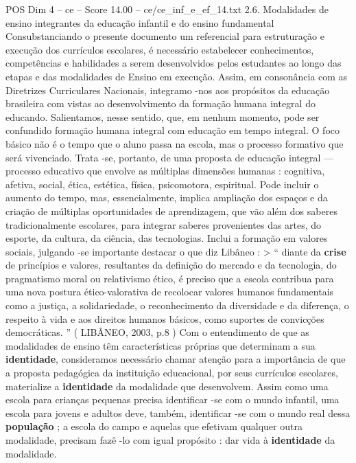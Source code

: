 \begin{textsample}{POS Dim 4 – ce – Score 14.00 – ce/ce\_inf\_e\_ef\_14.txt}  \label{ex:f4_pos_133}
2.6.
Modalidades de ensino integrantes da educação infantil e do ensino fundamental Consubstanciando o presente documento um referencial para estruturação e execução dos currículos escolares, é necessário estabelecer conhecimentos, competências e habilidades a serem desenvolvidos pelos estudantes ao longo das etapas e das modalidades de Ensino em execução.
Assim, em consonância com as Diretrizes Curriculares Nacionais, integramo -nos aos propósitos da educação brasileira com vistas ao desenvolvimento da formação humana integral do educando.
Salientamos, nesse sentido, que, em nenhum momento, pode ser confundido formação humana integral com educação em tempo integral.
O foco básico não é o tempo que o aluno passa na escola, mas o processo formativo que será vivenciado.
Trata -se, portanto, de uma proposta de educação integral — processo educativo que envolve as múltiplas dimensões humanas : cognitiva, afetiva, social, ética, estética, física, psicomotora, espiritual.
Pode incluir o aumento do tempo, mas, essencialmente, implica ampliação dos espaços e da criação de múltiplas oportunidades de aprendizagem, que vão além dos saberes tradicionalmente escolares, para integrar saberes provenientes das artes, do esporte, da cultura, da ciência, das tecnologias.
Inclui a formação em valores sociais, julgando -se importante destacar o que diz Libâneo : > “ diante da \textbf{crise} de princípios e valores, resultantes da definição do mercado e da tecnologia, do pragmatismo moral ou relativismo ético, é preciso que a escola contribua para uma nova postura ético-valorativa de recolocar valores humanos fundamentais como a justiça, a solidariedade, o reconhecimento da diversidade e da diferença, o respeito à vida e aos direitos humanos básicos, como suportes de convicções democráticas. ” ( LIBÂNEO, 2003, p.8 ) Com o entendimento de que as modalidades de ensino têm características próprias que determinam a sua \textbf{identidade}, consideramos necessário chamar atenção para a importância de que a proposta pedagógica da instituição educacional, por seus currículos escolares, materialize a \textbf{identidade} da modalidade que desenvolvem.
Assim como uma escola para crianças pequenas precisa identificar -se com o mundo infantil, uma escola para jovens e adultos deve, também, identificar -se com o mundo real dessa \textbf{população} ; a escola do campo e aquelas que efetivam qualquer outra modalidade, precisam fazê -lo com igual propósito : dar vida à \textbf{identidade} da modalidade.

\end{textsample}
